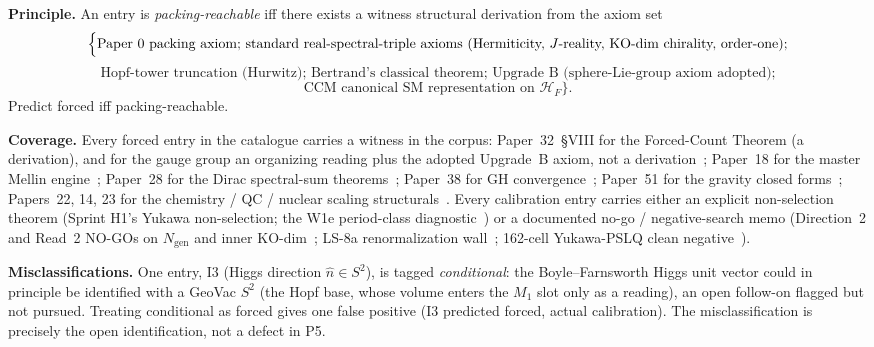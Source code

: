 \documentclass[11pt,a4paper]{article}
\theoremstyle{plain}
\theoremstyle{definition}
\newcommand{\Hcal}{\mathcal{H}}
\newcommand{\Ngen}{N_{\mathrm{gen}}}
\begin{document}
\textbf{Principle.}  An entry is \emph{packing-reachable} iff there exists a witness structural derivation from the axiom set
\begin{equation*}
  \Bigl\{ \text{Paper~0 packing axiom; standard real-spectral-triple axioms (Hermiticity, } J\text{-reality, KO-dim chirality, order-one);}
\end{equation*}
\begin{equation*}
  \text{Hopf-tower truncation (Hurwitz); Bertrand's classical theorem; Upgrade~B (sphere-Lie-group axiom adopted);}
\end{equation*}
\begin{equation*}
  \text{CCM canonical SM representation on } \Hcal_F \Bigr\}.
\end{equation*}
Predict forced iff packing-reachable.

\textbf{Coverage.}  Every forced entry in the catalogue carries a witness in the corpus:  Paper~32~\S VIII for the Forced-Count Theorem (a derivation), and for the gauge group an organizing reading plus the adopted Upgrade~B axiom, not a derivation~\cite{paper32}; Paper~18 for the master Mellin engine~\cite{paper18}; Paper~28 for the Dirac spectral-sum theorems~\cite{paper28}; Paper~38 for GH convergence~\cite{paper38}; Paper~51 for the gravity closed forms~\cite{paper51}; Papers~22, 14, 23 for the chemistry / QC / nuclear scaling structurals~\cite{paper22,paper14,paper23}. Every calibration entry carries either an explicit non-selection theorem (Sprint H1's Yukawa non-selection; the W1e period-class diagnostic~\cite{debug_w1e}) or a documented no-go / negative-search memo (Direction~2 and Read~2 NO-GOs on $\Ngen$ and inner KO-dim~\cite{debug_seam_packing,debug_read2}; LS-8a renormalization wall~\cite{paper36}; 162-cell Yukawa-PSLQ clean negative~\cite{debug_yukawa_pslq}).

\textbf{Misclassifications.}  One entry, I3 (Higgs direction $\hat n \in S^2$), is tagged \emph{conditional}:  the Boyle--Farnsworth Higgs unit vector could in principle be identified with a GeoVac $S^2$ (the Hopf base, whose volume enters the $M_1$ slot only as a reading), an open follow-on flagged but not pursued.  Treating conditional as forced gives one false positive (I3 predicted forced, actual calibration).  The misclassification is precisely the open identification, not a defect in P5.
\end{document}
